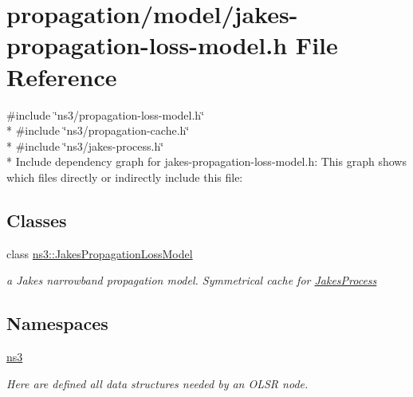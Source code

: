\hypertarget{jakes-propagation-loss-model_8h}{}\section{propagation/model/jakes-\/propagation-\/loss-\/model.h File Reference}
\label{jakes-propagation-loss-model_8h}
{\ttfamily \#include \char`\"{}ns3/propagation-\/loss-\/model.\+h\char`\"{}}\\*
{\ttfamily \#include \char`\"{}ns3/propagation-\/cache.\+h\char`\"{}}\\*
{\ttfamily \#include \char`\"{}ns3/jakes-\/process.\+h\char`\"{}}\\*
Include dependency graph for jakes-\/propagation-\/loss-\/model.h\+:
This graph shows which files directly or indirectly include this file\+:
\subsection*{Classes}
\begin{DoxyCompactItemize}
\item 
class \hyperlink{classns3_1_1JakesPropagationLossModel}{ns3\+::\+Jakes\+Propagation\+Loss\+Model}
\begin{DoxyCompactList}\small\item\em a Jakes narrowband propagation model. Symmetrical cache for \hyperlink{classns3_1_1JakesProcess}{Jakes\+Process} \end{DoxyCompactList}\end{DoxyCompactItemize}
\subsection*{Namespaces}
\begin{DoxyCompactItemize}
\item 
 \hyperlink{namespacens3}{ns3}
\begin{DoxyCompactList}\small\item\em Here are defined all data structures needed by an O\+L\+SR node. \end{DoxyCompactList}\end{DoxyCompactItemize}
